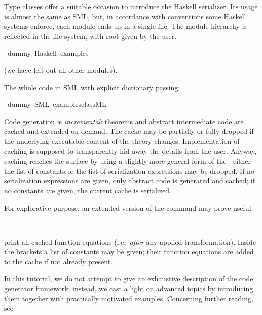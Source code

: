 \begin{isabellebody}
\begin{isamarkuptext}
Type classes offer a suitable occasion to introduce
  the Haskell serializer.  Its usage is almost the same
  as SML, but, in accordance with conventions
  some Haskell systems enforce, each module ends
  up in a single file. The module hierarchy is reflected in
  the file system, with root given by the user.%
\end{isamarkuptext}%
\isamarkuptrue%
\isamarkupfalse%
\ dummy\ {\isacharparenleft}Haskell\ {\isachardoublequoteopen}examples{\isacharslash}{\isachardoublequoteclose}{\isacharparenright}%
\begin{isamarkuptext}%

  (we have left out all other modules).

  The whole code in SML with explicit dictionary passing:%
\end{isamarkuptext}%
\isamarkuptrue%
\isamarkupfalse%
\ dummy\ {\isacharparenleft}SML\ {\isachardoublequoteopen}examples{\isacharslash}class{\isachardot}ML{\isachardoublequoteclose}{\isacharparenright}%
\begin{isamarkuptext}%
%
\end{isamarkuptext}%
\isamarkuptrue%
%
\isamarkuptrue%
%
\begin{isamarkuptext}%
Code generation is \emph{incremental}: theorems
  and abstract intermediate code are cached and extended on demand.
  The cache may be partially or fully dropped if the underlying
  executable content of the theory changes.
  Implementation of caching is supposed to transparently
  hid away the details from the user.  Anyway, caching
  reaches the surface by using a slightly more general form
  of the \isa{{\isasymCODEGEN}}: either the list of constants or the
  list of serialization expressions may be dropped.  If no
  serialization expressions are given, only abstract code
  is generated and cached; if no constants are given, the
  current cache is serialized.

  For explorative purpose, an extended version of the
  \isa{{\isasymCODEGEN}} command may prove useful:%
\end{isamarkuptext}%
\isamarkuptrue%
\isamarkupfalse%
\ {\isacharparenleft}{\isacharparenright}%
\begin{isamarkuptext}%
\noindent print all cached function equations (i.e.~\emph{after}
  any applied transformation). Inside the brackets a
  list of constants may be given; their function
  equations are added to the cache if not already present.%
\end{isamarkuptext}%
\isamarkuptrue%
%
\isamarkuptrue%
%
\begin{isamarkuptext}%
In this tutorial, we do not attempt to give an exhaustive
  description of the code generator framework; instead,
  we cast a light on advanced topics by introducing
  them together with practically motivated examples.  Concerning
  further reading, see


\end{isamarkuptext}
\end{isabellebody}
